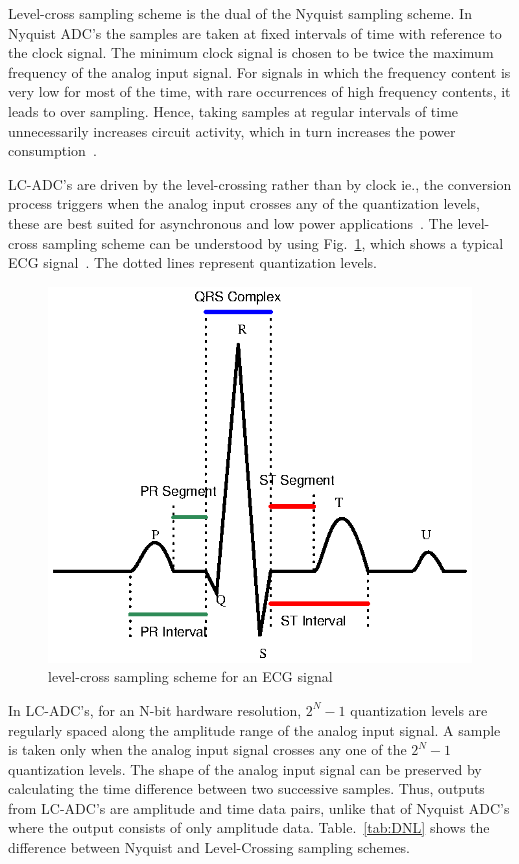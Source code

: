 \documentclass[conference]{IEEEtran}
\begin{document}
	Level-cross sampling scheme is the dual of the Nyquist sampling scheme. In Nyquist \mbox{ADC's} the samples are taken at fixed intervals of time with reference to the clock signal. The minimum clock signal is chosen to be twice the maximum frequency of the analog input signal. For signals in which the frequency content is very low for most of the time, with rare occurrences of high frequency contents, it leads to over sampling. Hence, taking samples at regular intervals of time unnecessarily increases circuit activity, which in turn increases the power consumption~\cite{sayiner1996level}.\par

	\mbox{LC-ADC's} are driven by the level-crossing rather than by clock ie., the conversion process triggers when the analog input crosses any of the quantization levels, these are best suited for asynchronous and low power applications~\cite{allier2003new}. The level-cross sampling scheme can be understood by using Fig.~\ref{fig:ECG}, which shows a typical ECG signal~\cite{}. The dotted lines represent quantization levels. \par

\begin{figure}[ht]
	\begin{center}
		\includegraphics[height=8.5 cm, angle=270]{./Figures/ECG.ps}
		\caption{level-cross sampling scheme for an ECG signal}
		\label{fig:ECG}
	\end{center}
\end{figure}

	In \mbox{LC-ADC's}, for an N-bit hardware resolution, $2^{N}-1$ quantization levels are regularly spaced along the amplitude range of the analog input signal. A sample is taken only when the analog input signal crosses any one of the $2^{N}-1$ quantization levels. The shape of the analog input signal can be preserved by calculating the time difference between two successive samples. Thus, outputs from \mbox{LC-ADC's} are amplitude and time data pairs, unlike that of Nyquist \mbox{ADC's} where the output consists of only amplitude data. Table.~\ref{tab:DNL} shows the difference between Nyquist and Level-Crossing sampling schemes. \par
\end{document}
